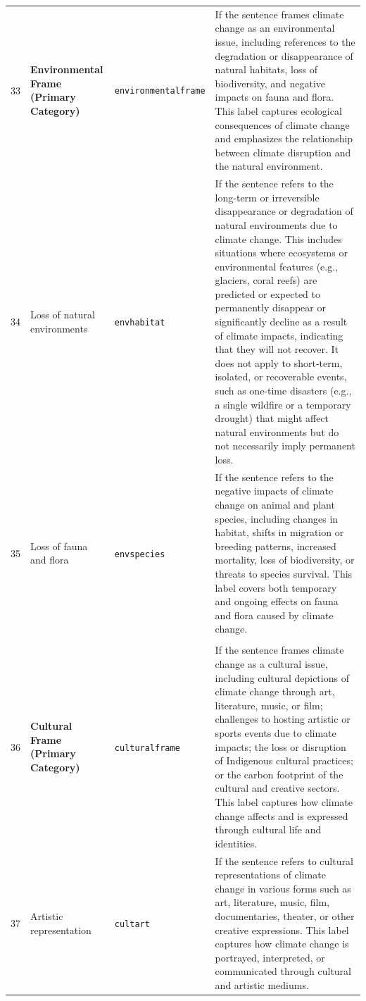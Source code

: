 \documentclass[12pt]{article}
\renewcommand\_{\texttt{\detokenize{_}\allowbreak}}
\begin{document}
{\begin{longtable}{p{0.5cm}p{4.5cm}p{2.8cm}p{13.5cm}}
\midrule
\rowcolor{gray!8}
\multicolumn{4}{l}{\textit{Environmental Frame}} \\
\midrule
33 & \textbf{Environmental Frame\newline (Primary Category)} & \texttt{environmental\_frame} & If the sentence frames climate change as an environmental issue, including references to the degradation or disappearance of natural habitats, loss of biodiversity, and negative impacts on fauna and flora. This label captures ecological consequences of climate change and emphasizes the relationship between climate disruption and the natural environment. \\
\cmidrule(lr){1-4}
34 & Loss of natural environments & \texttt{env\_habitat} & If the sentence refers to the long-term or irreversible disappearance or degradation of natural environments due to climate change. This includes situations where ecosystems or environmental features (e.g., glaciers, coral reefs) are predicted or expected to permanently disappear or significantly decline as a result of climate impacts, indicating that they will not recover. It does not apply to short-term, isolated, or recoverable events, such as one-time disasters (e.g., a single wildfire or a temporary drought) that might affect natural environments but do not necessarily imply permanent loss. \\
35 & Loss of fauna and flora & \texttt{env\_species} & If the sentence refers to the negative impacts of climate change on animal and plant species, including changes in habitat, shifts in migration or breeding patterns, increased mortality, loss of biodiversity, or threats to species survival. This label covers both temporary and ongoing effects on fauna and flora caused by climate change. \\
\midrule
\rowcolor{gray!8}
\multicolumn{4}{l}{\textit{Cultural Frame}} \\
\midrule
36 & \textbf{Cultural Frame\newline (Primary Category)} & \texttt{cultural\_frame} & If the sentence frames climate change as a cultural issue, including cultural depictions of climate change through art, literature, music, or film; challenges to hosting artistic or sports events due to climate impacts; the loss or disruption of Indigenous cultural practices; or the carbon footprint of the cultural and creative sectors. This label captures how climate change affects and is expressed through cultural life and identities. \\
\cmidrule(lr){1-4}
37 & Artistic representation & \texttt{cult\_art} & If the sentence refers to cultural representations of climate change in various forms such as art, literature, music, film, documentaries, theater, or other creative expressions. This label captures how climate change is portrayed, interpreted, or communicated through cultural and artistic mediums. \\

\end{longtable}}
\end{document}

